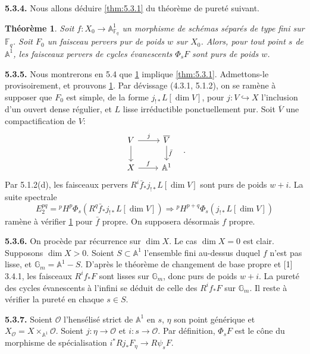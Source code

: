 \documentclass[12pt,a4paper]{article}
\theoremstyle{plain}
\newtheorem{theorem}{Th\'{e}or\`{e}me}[section]
\theoremstyle{definition}
\newcommand{\into}{\hookrightarrow}
\begin{document}
\noindent\textbf{5.3.4.} Nous allons d\'{e}duire \ref{thm:5.3.1} du th\'{e}or\`{e}me de puret\'{e} suivant.

\begin{theorem}\label{thm:5.3.4}
Soit $f: X_{0} \to \mathbb{A}_{\mathbb{F}_{q}}^{1}$ un morphisme de sch\'{e}mas s\'{e}par\'{e}s de type fini sur $\mathbb{F}_{q}$. Soit $F_{0}$ un faisceau pervers pur de poids $w$ sur $X_{0}$. Alors, pour tout point $s$ de $\mathbb{A}^{1}$, les faisceaux pervers de cycles \'{e}vanescents $\Phi_{s}F$ sont purs de poids $w$.
\end{theorem}

\noindent\textbf{5.3.5.} Nous montrerons en 5.4 que \ref{thm:5.3.4} implique \ref{thm:5.3.1}. Admettons-le provisoirement, et prouvons \ref{thm:5.3.4}. Par d\'{e}vissage (4.3.1, 5.1.2), on se ram\`{e}ne \`{a} supposer que $F_{0}$ est simple, de la forme $j_{!*}L[\dim V]$, pour $j: V \into X$ l'inclusion d'un ouvert dense r\'{e}gulier, et $L$ lisse irr\'{e}ductible ponctuellement pur. Soit $\overline{V}$ une compactification de $V$:
\[
\begin{tikzcd}
V \rar{j} \dar & \overline{V} \dar{\bar{f}} \\
X \rar{f} & \mathbb{A}^{1}
\end{tikzcd}
\quad.
\]
Par 5.1.2(d), les faisceaux pervers $R^{i}\bar{f}_{*}j_{!*}L[\dim V]$ sont purs de poids $w+i$. La suite spectrale
\[
E_{2}^{pq} = {}^{p}H^{p}\Phi_{s}(R^{q}\bar{f}_{*}j_{!*}L[\dim V]) \Rightarrow {}^{p}H^{p+q}\Phi_{s}(j_{!*}L[\dim V])
\]
ram\`{e}ne \`{a} v\'{e}rifier \ref{thm:5.3.4} pour $\bar{f}$ propre. On supposera d\'{e}sormais $f$ propre.

\noindent\textbf{5.3.6.} On proc\`{e}de par r\'{e}currence sur $\dim X$. Le cas $\dim X = 0$ est clair. Supposons $\dim X > 0$. Soient $S \subset \mathbb{A}^{1}$ l'ensemble fini au-dessus duquel $f$ n'est pas lisse, et $\mathbb{G}_{m} = \mathbb{A}^{1} - S$. D'apr\`{e}s le th\'{e}or\`{e}me de changement de base propre et [1] 3.4.1, les faisceaux $R^{i}f_{*}F$ sont lisses sur $\mathbb{G}_{m}$, donc purs de poids $w+i$. La puret\'{e} des cycles \'{e}vanescents \`{a} l'infini se d\'{e}duit de celle des $R^{i}f_{*}F$ sur $\mathbb{G}_{m}$. Il reste \`{a} v\'{e}rifier la puret\'{e} en chaque $s \in S$.

\noindent\textbf{5.3.7.} Soient $\mathcal{O}$ l'hens\'{e}lis\'{e} strict de $\mathbb{A}^{1}$ en $s$, $\eta$ son point g\'{e}n\'{e}rique et $X_{\mathcal{O}} = X \times_{\mathbb{A}^{1}} \mathcal{O}$. Soient $j: \eta \to \mathcal{O}$ et $i: s \to \mathcal{O}$. Par d\'{e}finition, $\Phi_{s}F$ est le c\^{o}ne du morphisme de sp\'{e}cialisation $i^{*}Rj_{*}F_{\eta} \to R\psi_{s}F$.
\end{document}
